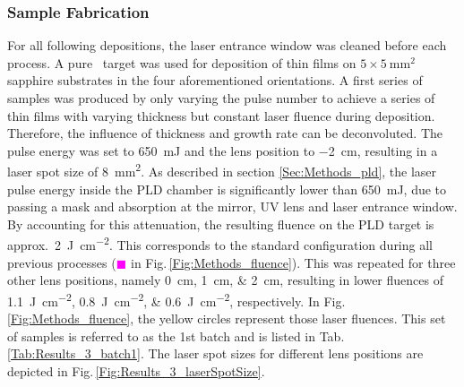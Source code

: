 \subsubsection*{Sample Fabrication}
For all following depositions, the laser entrance window was cleaned before each process.
A pure \cro\ target was used for deposition of thin films on $5\times\qty{5}{\mm\squared}$ sapphire substrates in the four aforementioned orientations.
A first series of samples was produced by only varying the pulse number to achieve a series of thin films with varying thickness but constant laser fluence during deposition.
Therefore, the influence of thickness and growth rate can be deconvoluted.
The pulse energy was set to \qty{650}{\milli\joule} and the lens position to \qty{-2}{\cm}, resulting in a laser spot size of \qty{8}{\mm\squared}.
As described in section \ref{Sec:Methods_pld}, the laser pulse energy inside the PLD chamber is significantly lower than \qty{650}{\milli\joule}, due to passing a mask and absorption at the mirror, UV lens and laser entrance window.
By accounting for this attenuation, the resulting fluence on the PLD target is approx.\ \qty{2}{\joule\per\cm\squared}.
This corresponds to the standard configuration during all previous processes (\textcolor{magenta}{$\blacksquare$} in Fig.\,\ref{Fig:Methods_fluence}).
This was repeated for three other lens positions, namely \qtylist{0;1;2}{\cm}, resulting in lower fluences of \qtylist{1.1;0.8;0.6}{\J\per\cm\squared}, respectively.
In Fig.\,\ref{Fig:Methods_fluence}, the yellow circles represent those laser fluences.
This set of samples is referred to as the 1st batch and is listed in Tab.\,\ref{Tab:Results_3_batch1}.
The laser spot sizes for different lens positions are depicted in Fig.\,\ref{Fig:Results_3_laserSpotSize}.

